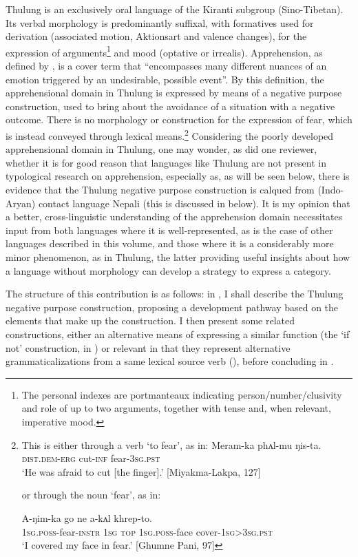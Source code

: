 \documentclass[output=paper,colorlinks,citecolor=brown,
]{langscibook}
\begin{document}
Thulung is an exclusively oral language of the Kiranti subgroup (Sino-Tibetan). Its verbal morphology is predominantly suffixal, with formatives used for derivation (associated motion, Aktionsart and valence changes), for the expression of arguments\footnote{The personal indexes are portmanteaux indicating person/number/clusivity and role of up to two arguments, together with tense and, when relevant, imperative mood.} and mood (optative or irrealis). Apprehension, as defined by \citet[262]{vuillermet2018a}, is a cover term that ``encompasses many different nuances of an emotion triggered by an undesirable, possible event''. By this definition, the apprehensional domain in Thulung is expressed by means of a negative purpose construction, used to bring about the avoidance of a situation with a negative outcome. There is no morphology or construction for the expression of fear, which is instead conveyed through lexical means.\footnote{This is either through a verb `to fear', as in:
\ea \label{footnoteex}
\gll Meram-ka phʌl-mu ŋis-ta. \\
\textsc{dist.dem-erg} cut-\textsc{inf} fear-\textsc{3sg.pst} \\
\glt `He was afraid to cut [the finger].' [Miyakma-Lakpa, 127]
\z

or through the noun `fear', as in:

\ea \label{footnoteex2}
\gll A-ŋim-ka go ne a-kʌl khrep-to. \\
\textsc{1sg.poss}-fear-\textsc{instr} \textsc{1sg} \textsc{top} \textsc{1sg.poss}-face cover-\textsc{1sg>3sg.pst} \\
\glt `I covered my face in fear.' [Ghumne Pani, 97]
\z} Considering the poorly developed apprehensional domain in Thulung, one may wonder, as did one reviewer, whether it is for good reason that languages like Thulung are not present in typological research on apprehension, especially as, as will be seen below, there is evidence that the Thulung negative purpose construction is calqued from (Indo-Aryan) contact language Nepali (this is discussed in  below). It is my opinion that a better, cross-linguistic understanding of the apprehension domain necessitates input from both languages where it is well-represented, as is the case of other languages described in this volume, and those where it is a considerably more minor phenomenon, as in Thulung, the latter providing useful insights about how a language without morphology can develop a strategy to express a category.

The structure of this contribution is as follows: in , I shall describe the Thulung negative purpose construction, proposing a development pathway based on the elements that make up the construction. I then present some related constructions, either an alternative means of expressing a similar function (the `if not' construction, in ) or relevant in that they represent alternative grammaticalizations from a same lexical source verb (), before concluding in .
\end{document}
